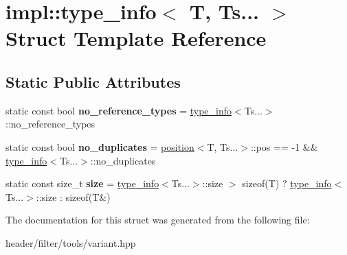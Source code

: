 \hypertarget{structimpl_1_1type__info_3_01_t_00_01_ts_8_8_8_01_4}{}\section{impl\+:\+:type\+\_\+info$<$ T, Ts... $>$ Struct Template Reference}
\label{structimpl_1_1type__info_3_01_t_00_01_ts_8_8_8_01_4}
\subsection*{Static Public Attributes}
\begin{DoxyCompactItemize}
\item 
\mbox{\label{structimpl_1_1type__info_3_01_t_00_01_ts_8_8_8_01_4_aa0ccedcbaa9a16db507036ec2eafd620}} 
static const bool {\bfseries no\+\_\+reference\+\_\+types} = \hyperlink{structimpl_1_1type__info}{type\+\_\+info}$<$Ts...$>$\+::no\+\_\+reference\+\_\+types
\item 
\mbox{\label{structimpl_1_1type__info_3_01_t_00_01_ts_8_8_8_01_4_a3d04a0cd06d3ede7eb9b513de11cf12e}} 
static const bool {\bfseries no\+\_\+duplicates} = \hyperlink{structimpl_1_1position}{position}$<$T, Ts...$>$\+::pos == -\/1 \&\& \hyperlink{structimpl_1_1type__info}{type\+\_\+info}$<$Ts...$>$\+::no\+\_\+duplicates
\item 
\mbox{\label{structimpl_1_1type__info_3_01_t_00_01_ts_8_8_8_01_4_a35944624b4c281b17da92c4af32d3a26}} 
static const size\+\_\+t {\bfseries size} = \hyperlink{structimpl_1_1type__info}{type\+\_\+info}$<$Ts...$>$\+::size $>$ sizeof(T) ? \hyperlink{structimpl_1_1type__info}{type\+\_\+info}$<$Ts...$>$\+::size \+: sizeof(T\&)
\end{DoxyCompactItemize}


The documentation for this struct was generated from the following file\+:\begin{DoxyCompactItemize}
\item 
header/filter/tools/variant.\+hpp\end{DoxyCompactItemize}
